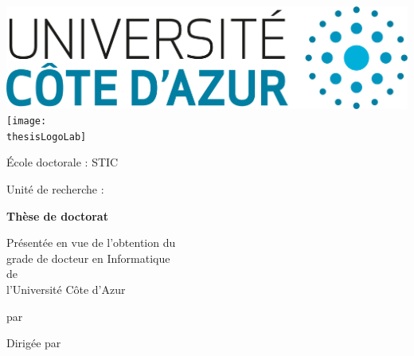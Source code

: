 \setcounter{page}{0}
\thispagestyle{empty}

\includegraphics[scale=.1]{front_page/uca.png}
\hfill
\texttt{[image: \\thesisLogoLab]}

\vspace{2cm}

\begin{center}
    École doctorale : STIC

    Unité de recherche : \thesisLab
\end{center}

\vspace*{1cm}
\begin{center}
    {\Huge \bf Thèse de doctorat}

    Présentée en vue de l'obtention du\\ grade de docteur en Informatique\\ de\\ l'Université Côte d'Azur

    \vspace*{1cm}
    par

    \vspace{.3cm}
    {\huge \bf \thesisAuthor}

    \vspace*{2cm}
    {\Huge
        \begin{onehalfspace}
            {\bf \thesisTitle}
        \end{onehalfspace}
    }

    \vspace*{1cm}
    Dirigée par \thesisSupervisor

    \vspace*{1cm}
\end{center}

\\[1ex]
\begin{center}
    \thesisJury
\end{center}

\newpage

